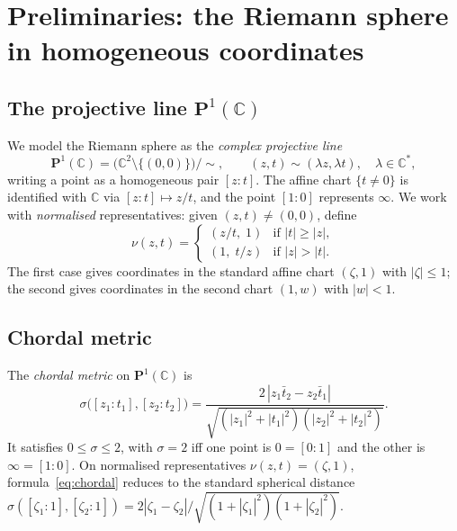 \documentclass[12pt]{article}
\theoremstyle{definition}
\newcommand{\C}{\mathbb{C}}
\newcommand{\Pone}{\mathbf{P}^1(\C)}
\begin{document}
\section{Preliminaries: the Riemann sphere in homogeneous coordinates}
\label{sec:prelim}

\subsection{The projective line $\Pone$}

We model the Riemann sphere as the \emph{complex projective line}
\[
  \Pone = \bigl(\C^2\setminus\{(0,0)\}\bigr)\big/{\sim},
  \qquad
  (z,t)\sim(\lambda z,\lambda t),\quad \lambda\in\C^*,
\]
writing a point as a homogeneous pair $[z:t]$.  The affine chart
$\{t\neq 0\}$ is identified with $\C$ via $[z:t]\mapsto z/t$, and the
point $[1:0]$ represents $\infty$.  We work with \emph{normalised}
representatives: given $(z,t)\neq(0,0)$, define
\begin{equation}\label{eq:normalize}
  \nu(z,t) =
  \begin{cases}
    (z/t,\;1)   & \text{if }|t|\geq|z|,\\[2pt]
    (1,\;t/z)   & \text{if }|z|>|t|.
  \end{cases}
\end{equation}
The first case gives coordinates in the standard affine chart
$(\zeta,1)$ with $|\zeta|\leq 1$; the second gives coordinates in the
second chart $(1,w)$ with $|w|<1$.

\subsection{Chordal metric}

The \emph{chordal metric} on $\Pone$ is
\begin{equation}\label{eq:chordal}
  \sigma\bigl([z_1:t_1],[z_2:t_2]\bigr)
  = \frac{2\,|z_1\bar t_2 - z_2\bar t_1|}%
         {\sqrt{(|z_1|^2+|t_1|^2)(|z_2|^2+|t_2|^2)}}.
\end{equation}
It satisfies $0\leq\sigma\leq 2$, with $\sigma=2$ iff one point is $0=[0:1]$
and the other is $\infty=[1:0]$.  On normalised representatives
$\nu(z,t)=(\zeta,1)$, formula~\eqref{eq:chordal} reduces to the standard
spherical distance
$\sigma([\zeta_1:1],[\zeta_2:1]) = 2|\zeta_1-\zeta_2|/\sqrt{(1+|\zeta_1|^2)(1+|\zeta_2|^2)}$.
\end{document}
